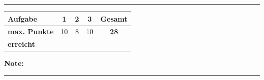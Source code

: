 \documentclass[11pt, a4paper]{article}
\newcommand{\luecke}[1]{\rule{#1}{0.4pt}}
\begin{document}

\vspace{25pt}
\hrule
\vspace{10pt}

\noindent
\begin{tabularx}{\textwidth}{|X|c|c|c||c|}
\hline
\textbf{Aufgabe} & 1 & 2 & 3 & \textbf{Gesamt} \\
\hline
\textbf{max. Punkte} & 10 & 8 & 10 & \textbf{28} \\
\hline
\textbf{erreicht} & & & & \\[0.8em]
\hline
\end{tabularx}

\vspace{10pt}

\begin{flushright}
\textbf{Note:} \luecke{2cm}
\end{flushright}
\end{document}
